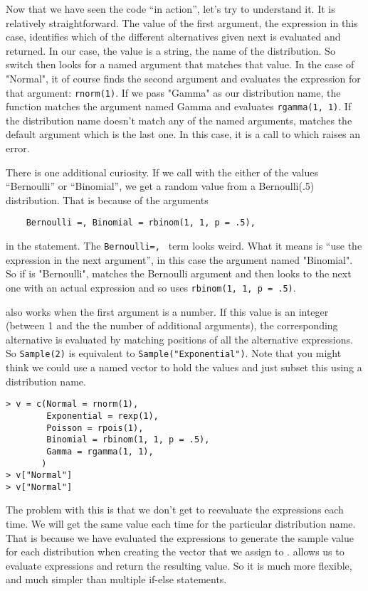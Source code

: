 Now that we have seen the code ``in action'', let's try to understand
it. It is relatively straightforward. The value of the first argument,
the expression  in this case, identifies which of
the different alternatives given next is evaluated and returned. In
our case, the value is a string, the name of the distribution. So
switch then looks for a named argument that matches that value. In the
case of "Normal", it of course finds the second argument and evaluates
the expression for that argument: \verb|rnorm(1)|. If we pass "Gamma"
as our distribution name, the  function matches the
argument named Gamma and evaluates \verb|rgamma(1, 1)|. If the
distribution name doesn't match any of the named arguments,
 matches the default argument which is the last
one. In this case, it is a call to  which raises an
error.

There is one additional curiosity. If we call  with
the either of the values ``Bernoulli'' or ``Binomial'', we get a
random value from a Bernoulli(.5) distribution. That is because of the
arguments
\begin{verbatim}
    Bernoulli =, Binomial = rbinom(1, 1, p = .5),
\end{verbatim}
in the  statement. The \verb|Bernoulli=, | term
looks weird. What it means is ``use the expression in the next
argument'', in this case the argument named "Binomial". So if
 is "Bernoulli",  matches the
Bernoulli argument and then looks to the next one with an actual
expression and so uses \verb|rbinom(1, 1, p = .5)|.

 also works when the first argument is a number. If
this value is an integer (between 1 and the the number of additional
arguments), the corresponding alternative is evaluated by matching
positions of all the alternative expressions. So \verb|Sample(2)| is
equivalent to \verb|Sample("Exponential")|. Note that you might think
we could use a named vector to hold the values and just subset this
using a distribution name.
\begin{verbatim}
> v = c(Normal = rnorm(1),
        Exponential = rexp(1),
        Poisson = rpois(1),
        Binomial = rbinom(1, 1, p = .5),
        Gamma = rgamma(1, 1),
       )
> v["Normal"]
> v["Normal"]
\end{verbatim}
The problem with this is that we don't get to reevaluate the
expressions each time. We will get the same value each time for the
particular distribution name. That is because we have evaluated the
expressions to generate the sample value for each distribution when
creating the vector that we assign to
.  allows us to evaluate expressions
and return the resulting value. So it is much more flexible, and much
simpler than multiple if-else statements.


